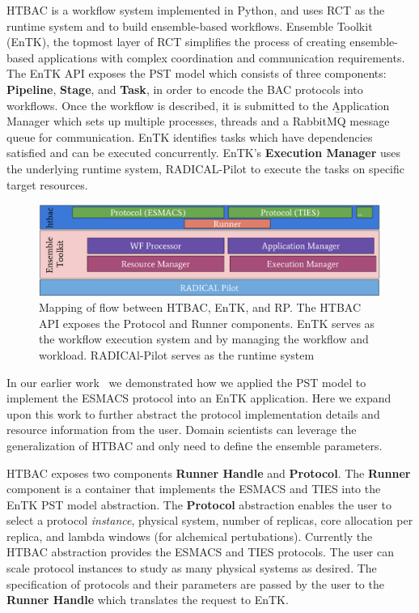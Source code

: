 HTBAC is a workflow system implemented in Python, and uses RCT as the runtime
system and to build ensemble-based workflows. Ensemble Toolkit (EnTK), the
topmost layer of RCT simplifies the process of creating ensemble-based
applications with complex coordination and communication requirements. The
EnTK API exposes the PST model which consists of three components:
\textbf{Pipeline}, \textbf{Stage}, and \textbf{Task}, in order to encode the
BAC protocols into workflows. Once the workflow is described, it is submitted
to the \b{Application Manager} which sets up multiple processes, threads and a
RabbitMQ message queue for communication. EnTK identifies tasks which have
dependencies satisfied and can be executed concurrently. EnTK's
\textbf{Execution Manager} uses the underlying runtime system, RADICAL-Pilot
to execute the tasks on specific target resources.


\begin{figure}
  \centering
   \includegraphics[width=\columnwidth]{figures/isc_htbac_integration_with_entk_RP.pdf}
  \caption{Mapping of flow between HTBAC, EnTK, and RP. The HTBAC API exposes the Protocol
  and Runner components. EnTK serves as the workflow execution system and
  by managing the workflow and workload. RADICAl-Pilot serves as the runtime system}
\label{fig:integration}
\end{figure}

	In our earlier work~\cite{dakka2017} we demonstrated how we applied the PST model to
implement the ESMACS protocol into an EnTK application. Here we expand upon this
work to further abstract the protocol implementation details and resource
information from the user. Domain scientists can leverage the generalization
of HTBAC and only need to define the ensemble parameters.

	HTBAC exposes two components \textbf{Runner Handle} and \textbf{Protocol}.
The \textbf{Runner} component is a container that implements the ESMACS 
and TIES into the EnTK PST model abstraction. The \textbf{Protocol} 
abstraction enables the user to select a protocol \textit{instance}, physical
system, number of replicas, core allocation per replica, and lambda 
windows (for alchemical pertubations). Currently the HTBAC abstraction provides
the ESMACS and TIES protocols. The user can scale protocol instances to study as
many physical systems as desired. The specification of protocols and 
their parameters are passed by the user to the \textbf{Runner Handle} which 
translates the request to EnTK. 

